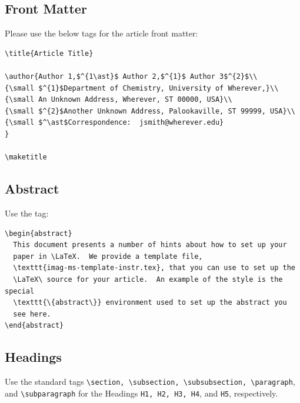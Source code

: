\documentclass[]{imag-ms-template}
\begin{document}
\newpage

\subsection{Front Matter}

Please use the below tags for the article front matter:

\begin{verbatim}
\title{Article Title} 

\author{Author 1,$^{1\ast}$ Author 2,$^{1}$ Author 3$^{2}$\\
{\small $^{1}$Department of Chemistry, University of Wherever,}\\
{\small An Unknown Address, Wherever, ST 00000, USA}\\
{\small $^{2}$Another Unknown Address, Palookaville, ST 99999, USA}\\
{\small $^\ast$Correspondence:  jsmith@wherever.edu}
}

\maketitle
\end{verbatim}

\subsection{Abstract}

Use the tag:

\begin{verbatim}
\begin{abstract}
  This document presents a number of hints about how to set up your
  paper in \LaTeX.  We provide a template file,
  \texttt{imag-ms-template-instr.tex}, that you can use to set up the
  \LaTeX\ source for your article.  An example of the style is the special
  \texttt{\{abstract\}} environment used to set up the abstract you
  see here.
\end{abstract}
\end{verbatim}

\subsection{Headings}

Use the standard tags \verb!\section, \subsection, \subsubsection, \paragraph!, and \verb!\subparagraph! for the Headings \verb!H1, H2, H3, H4!, and \verb!H5!, respectively.
\end{document}
